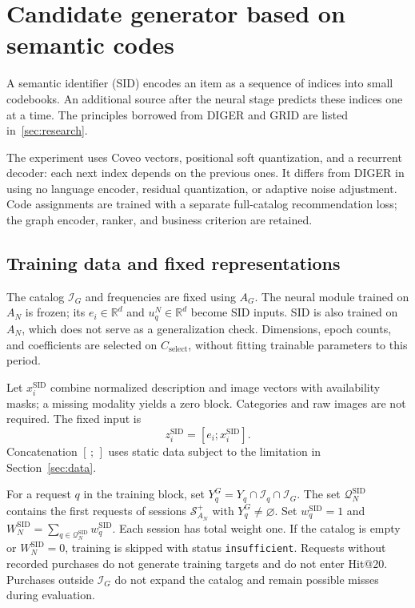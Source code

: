 \documentclass[12pt,a4paper]{article}
\newcommand{\code}[1]{{\ttfamily\small\nolinkurl{#1}}}
\newcommand{\R}{\mathbb R}
\theoremstyle{plainru}
\begin{document}
\section{Candidate generator based on semantic codes}
\label{sec:sid-overview}

A semantic identifier (SID) encodes an item as a sequence
of indices into small codebooks. An additional source after the neural
stage predicts these indices one at a time.
The principles borrowed from DIGER and GRID are listed in~\ref{sec:research}.

The experiment uses Coveo vectors, positional soft quantization,
and a recurrent decoder: each next index depends on the previous ones.
It differs from DIGER in using no language encoder, residual
quantization, or adaptive noise adjustment. Code assignments are trained
with a separate full-catalog recommendation loss; the graph
encoder, ranker, and business criterion are retained.

\subsection{Training data and fixed representations}
\label{sec:sid-data}

The catalog $\mathcal I_G$ and frequencies are fixed using $A_G$.
The neural module trained on $A_N$ is frozen;
its $e_i\in\R^d$ and $u_q^N\in\R^d$ become SID inputs.
SID is also trained on $A_N$, which does not serve as a generalization check.
Dimensions, epoch counts, and coefficients are selected on $C_{\mathrm{select}}$,
without fitting trainable parameters to this period.

Let $x_i^{\mathrm{SID}}$ combine normalized description
and image vectors with availability masks; a missing modality yields
a zero block. Categories and raw images are not required.
The fixed input is
\begin{equation}\label{eq:sid-fixed-input}
 z_i^{\mathrm{SID}}=[e_i;x_i^{\mathrm{SID}}].
\end{equation}
Concatenation $[\,;\,]$ uses static data
subject to the limitation in Section~\ref{sec:data}.

For a request $q$ in the training block, set
$Y_q^G=Y_q\cap\mathcal I_q\cap\mathcal I_G$.
The set $\mathcal Q_N^{\mathrm{SID}}$ contains the first requests of sessions
$\mathcal S_{A_N}^{+}$ with $Y_q^G\ne\varnothing$. Set
$w_q^{\mathrm{SID}}=1$ and
$W_N^{\mathrm{SID}}=\sum_{q\in\mathcal Q_N^{\mathrm{SID}}}w_q^{\mathrm{SID}}$.
Each session has total weight one. If the catalog is empty
or $W_N^{\mathrm{SID}}=0$, training is skipped with status
\code{insufficient}. Requests without recorded purchases do not generate
training targets and do not enter Hit@20. Purchases outside $\mathcal I_G$
do not expand the catalog and remain possible misses during evaluation.
\end{document}
